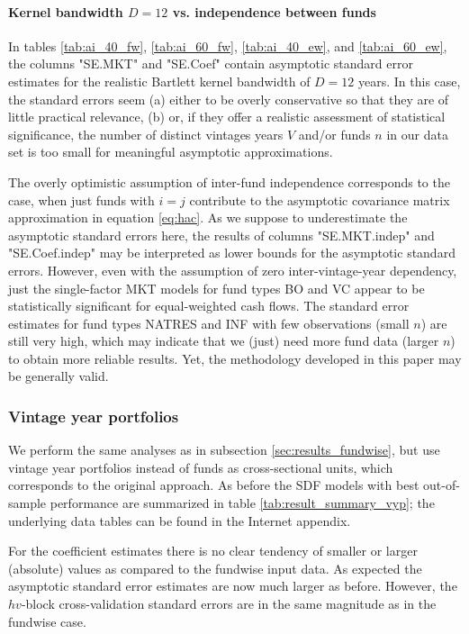 \documentclass[12pt]{article}
\begin{document}
\paragraph{Kernel bandwidth $D=12$ vs. independence between funds}

In tables \ref{tab:ai_40_fw}, \ref{tab:ai_60_fw}, \ref{tab:ai_40_ew}, and  \ref{tab:ai_60_ew}, the columns "SE.MKT" and "SE.Coef" contain asymptotic standard error estimates for the realistic Bartlett kernel bandwidth of $D=12$ years.
In this case, the standard errors seem (a) either to be overly conservative so that they are of little practical relevance, (b) or, if they offer a realistic assessment of statistical significance, the number of distinct vintages years $V$ and/or funds $n$ in our data set is too small for meaningful asymptotic approximations.

The overly optimistic assumption of inter-fund independence corresponds to the case, when just funds with $i=j$ contribute to the asymptotic covariance matrix approximation in equation \ref{eq:hac}.
As we suppose to underestimate the asymptotic standard errors here, the results of columns "SE.MKT.indep" and "SE.Coef.indep" may be interpreted as lower bounds for the asymptotic standard errors.
However, even with the assumption of zero inter-vintage-year dependency, just the single-factor MKT models for fund types BO and VC appear to be statistically significant for equal-weighted cash flows.
The standard error estimates for fund types NATRES and INF with few observations (small $n$) are still very high, which may indicate that we (just) need more fund data (larger $n$) to obtain more reliable results.
Yet, the methodology developed in this paper may be generally valid.


\subsubsection{Vintage year portfolios}

We perform the same analyses as in subsection \ref{sec:results_fundwise}, but use vintage year portfolios instead of funds as cross-sectional units, which corresponds to the original \cite{DLP12} approach.
As before the SDF models with best out-of-sample performance are summarized in table \ref{tab:result_summary_vyp}; the underlying data tables can be found in the Internet appendix. 

For the coefficient estimates there is no clear tendency of smaller or larger (absolute) values as compared to the fundwise input data.
As expected the asymptotic standard error estimates are now much larger as before.
However, the $hv$-block cross-validation standard errors are in the same magnitude as in the fundwise case.
\end{document}
